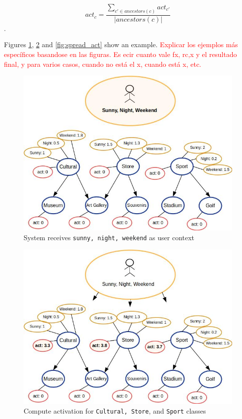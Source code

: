 \begin{equation} \label{eq:activation}
    act_c = \frac{\displaystyle \sum_{c' \in ancestors(c)} act_{c'}}{|ancestors(c)|}
\end{equation}.

Figures \ref{fig:init_act}, \ref{fig:high_act} and \ref{fig:spread_act} show an example. \textcolor{red}{Explicar los ejemplos más específicos basandose en las figuras. Es ecir cuanto vale fx, rc,x y el resultado final, y para varios casos, cuando no está el x, cuando está x, etc.}


\begin{figure}[h]
\centering
\includegraphics[scale=0.45]{draws/initial_act.jpg}
\caption{System receives {\tt sunny, night, weekend} as user context}
\label{fig:init_act}
\end{figure}


\begin{figure}[h]
\centering
\includegraphics[scale=0.45]{draws/high_act.jpg}
\caption{Compute activation for {\tt Cultural, Store}, and {\tt Sport} classes}
\label{fig:high_act}
\end{figure}

